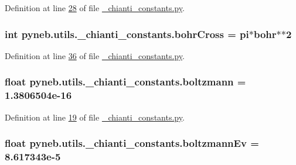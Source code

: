 Definition at line \hyperlink{__chianti__constants_8py_source_l00028}{28} of file \hyperlink{__chianti__constants_8py_source}{\-\_\-chianti\-\_\-constants.\-py}.

\hypertarget{namespacepyneb_1_1utils_1_1__chianti__constants_ae93f86759a381070e7ceffd8a9522dfe}{
\subsubsection[{bohr\-Cross}]{\setlength{\rightskip}{0pt plus 5cm}int pyneb.\-utils.\-\_\-chianti\-\_\-constants.\-bohr\-Cross = {\bf pi}$\ast${\bf bohr}$\ast$$\ast$2}}\label{namespacepyneb_1_1utils_1_1__chianti__constants_ae93f86759a381070e7ceffd8a9522dfe}


Definition at line \hyperlink{__chianti__constants_8py_source_l00036}{36} of file \hyperlink{__chianti__constants_8py_source}{\-\_\-chianti\-\_\-constants.\-py}.

\hypertarget{namespacepyneb_1_1utils_1_1__chianti__constants_a6ff0fc21098c2ae57403ff849add9d25}{
\subsubsection[{boltzmann}]{\setlength{\rightskip}{0pt plus 5cm}float pyneb.\-utils.\-\_\-chianti\-\_\-constants.\-boltzmann = 1.\-3806504e-\/16}}\label{namespacepyneb_1_1utils_1_1__chianti__constants_a6ff0fc21098c2ae57403ff849add9d25}


Definition at line \hyperlink{__chianti__constants_8py_source_l00019}{19} of file \hyperlink{__chianti__constants_8py_source}{\-\_\-chianti\-\_\-constants.\-py}.

\hypertarget{namespacepyneb_1_1utils_1_1__chianti__constants_af362f939017652aca9c7101b749e1e41}{
\subsubsection[{boltzmann\-Ev}]{\setlength{\rightskip}{0pt plus 5cm}float pyneb.\-utils.\-\_\-chianti\-\_\-constants.\-boltzmann\-Ev = 8.\-617343e-\/5}}\label{namespacepyneb_1_1utils_1_1__chianti__constants_af362f939017652aca9c7101b749e1e41}


